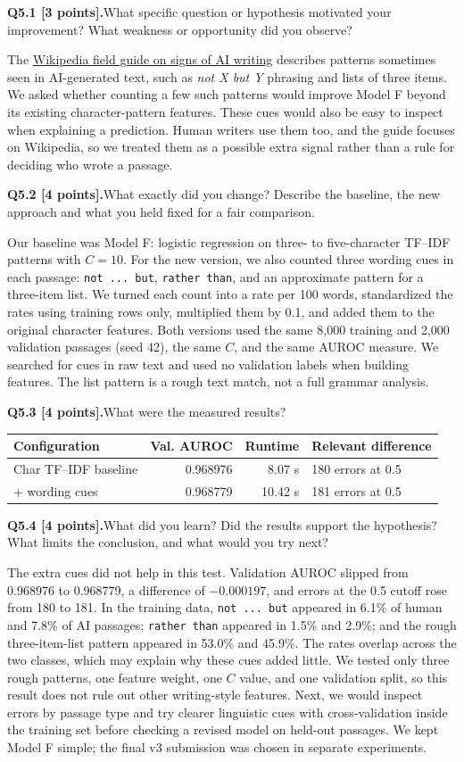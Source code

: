 \documentclass[11pt,letterpaper]{article}
\newcommand{\question}[2]{\needspace{4\baselineskip}\par\addvspace{0.45em}\noindent\textbf{#1}\quad #2\par\nobreak\vspace{0.1em}}
\begin{document}
\question{Q5.1 [3 points].}{What specific question or hypothesis motivated your improvement? What weakness or opportunity did you observe?}
The \href{https://en.wikipedia.org/wiki/Wikipedia:Signs_of_AI_writing}{Wikipedia field guide on signs of AI writing} describes patterns sometimes seen in AI-generated text, such as \emph{not X but Y} phrasing and lists of three items. We asked whether counting a few such patterns would improve Model F beyond its existing character-pattern features. These cues would also be easy to inspect when explaining a prediction. Human writers use them too, and the guide focuses on Wikipedia, so we treated them as a possible extra signal rather than a rule for deciding who wrote a passage.
\question{Q5.2 [4 points].}{What exactly did you change? Describe the baseline, the new approach and what you held fixed for a fair comparison.}
Our baseline was Model F: logistic regression on three- to five-character TF--IDF patterns with $C=10$. For the new version, we also counted three wording cues in each passage: \texttt{not ... but}, \texttt{rather than}, and an approximate pattern for a three-item list. We turned each count into a rate per 100 words, standardized the rates using training rows only, multiplied them by 0.1, and added them to the original character features. Both versions used the same 8,000 training and 2,000 validation passages (seed 42), the same $C$, and the same AUROC measure. We searched for cues in raw text and used no validation labels when building features. The list pattern is a rough text match, not a full grammar analysis.
\question{Q5.3 [4 points].}{What were the measured results?}
\begin{tabularx}{\linewidth}{@{}YrrY@{}}\toprule Configuration & Val. AUROC & Runtime & Relevant difference \\ \midrule Char TF--IDF baseline & 0.968976 & 8.07 s & 180 errors at 0.5 \\ + wording cues & 0.968779 & 10.42 s & 181 errors at 0.5 \\ \bottomrule\end{tabularx}
\question{Q5.4 [4 points].}{What did you learn? Did the results support the hypothesis? What limits the conclusion, and what would you try next?}
The extra cues did not help in this test. Validation AUROC slipped from 0.968976 to 0.968779, a difference of $-0.000197$, and errors at the 0.5 cutoff rose from 180 to 181. In the training data, \texttt{not ... but} appeared in 6.1\% of human and 7.8\% of AI passages; \texttt{rather than} appeared in 1.5\% and 2.9\%; and the rough three-item-list pattern appeared in 53.0\% and 45.9\%. The rates overlap across the two classes, which may explain why these cues added little. We tested only three rough patterns, one feature weight, one $C$ value, and one validation split, so this result does not rule out other writing-style features. Next, we would inspect errors by passage type and try clearer linguistic cues with cross-validation inside the training set before checking a revised model on held-out passages. We kept Model F simple; the final v3 submission was chosen in separate experiments.
\end{document}
